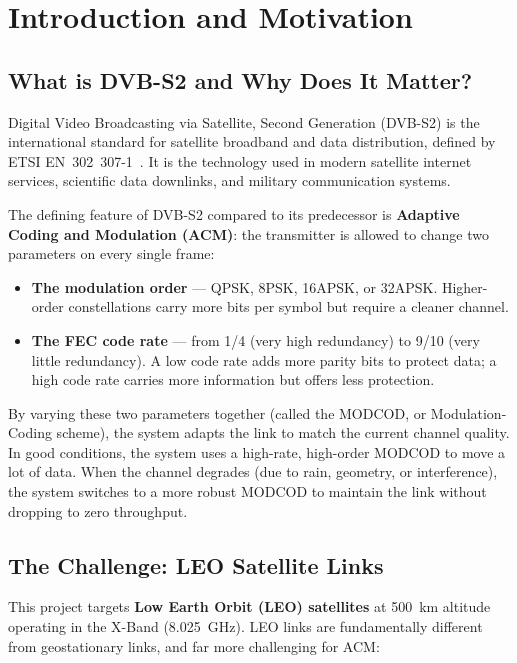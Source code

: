 \documentclass[12pt,a4paper]{report}
\begin{document}
\chapter{Introduction and Motivation}

\section{What is DVB-S2 and Why Does It Matter?}

Digital Video Broadcasting via Satellite, Second Generation (DVB-S2) is the
international standard for satellite broadband and data distribution, defined
by ETSI EN~302~307-1~\cite{etsi_dvbs2}. It is the technology used in modern
satellite internet services, scientific data downlinks, and military
communication systems.

The defining feature of DVB-S2 compared to its predecessor is \textbf{Adaptive
Coding and Modulation (ACM)}: the transmitter is allowed to change two
parameters on every single frame:
\begin{itemize}[nosep]
    \item \textbf{The modulation order} --- QPSK, 8PSK, 16APSK, or 32APSK.
          Higher-order constellations carry more bits per symbol but require a
          cleaner channel.
    \item \textbf{The FEC code rate} --- from 1/4 (very high redundancy) to
          9/10 (very little redundancy). A low code rate adds more parity bits
          to protect data; a high code rate carries more information but offers
          less protection.
\end{itemize}

By varying these two parameters together (called the MODCOD, or
Modulation-Coding scheme), the system adapts the link to match the current
channel quality. In good conditions, the system uses a high-rate, high-order
MODCOD to move a lot of data. When the channel degrades (due to rain, geometry,
or interference), the system switches to a more robust MODCOD to maintain the
link without dropping to zero throughput.

\section{The Challenge: LEO Satellite Links}

This project targets \textbf{Low Earth Orbit (LEO) satellites} at 500~km
altitude operating in the X-Band (8.025~GHz). LEO links are fundamentally
different from geostationary links, and far more challenging for ACM:
\end{document}
